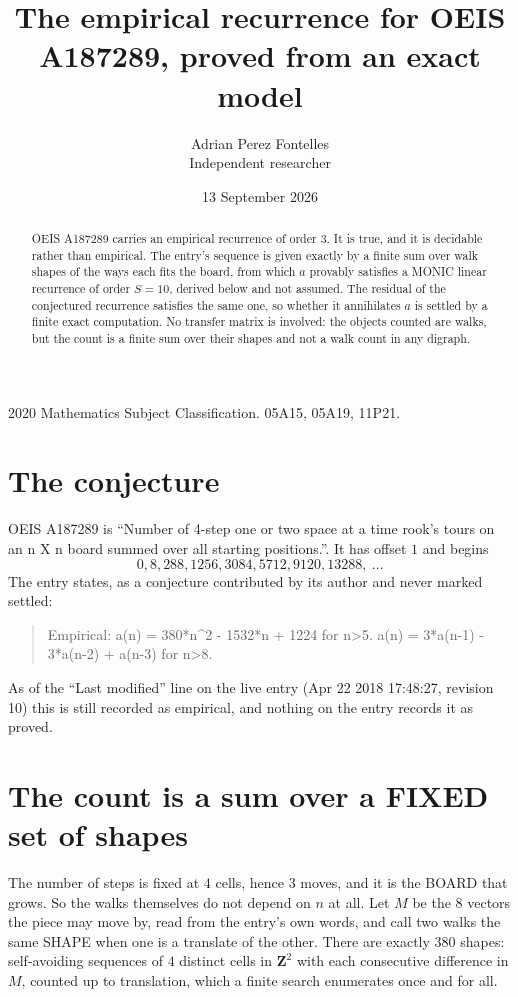 \documentclass[11pt,a4paper]{article}
\title{The empirical recurrence for OEIS A187289, proved from an exact model}
\author{Adrian Perez Fontelles\\ \small Independent researcher}
\date{13 September 2026}
\theoremstyle{plain}
\theoremstyle{definition}
\begin{document}
\maketitle

\begin{abstract}
OEIS A187289 carries an empirical recurrence of order $3$. It is true, and it is
decidable rather than empirical. The entry's sequence is given exactly by a finite sum over walk shapes of the ways each fits the board, from
which $a$ provably satisfies a MONIC linear recurrence of order $S=10$, derived below and not
assumed. The residual of the conjectured recurrence satisfies the same one, so whether it
annihilates $a$ is settled by a finite exact computation. No transfer matrix is involved: the objects counted are walks, but the count is a finite sum over their shapes and not a walk count in any digraph.
\end{abstract}

\noindent\small 2020 Mathematics Subject Classification. 05A15, 05A19, 11P21.\normalsize

\section{The conjecture}

OEIS A187289 is ``Number of 4-step one or two space at a time rook's tours on an n X n board summed over all starting positions.''. It has offset $1$ and begins
\[
0, 8, 288, 1256, 3084, 5712, 9120, 13288,\ \dots
\]
The entry states, as a conjecture contributed by its author and never marked settled:
\begin{quote}
Empirical: a(n) = 380*n\^{}2 - 1532*n + 1224 for n>5. a(n) = 3*a(n-1) - 3*a(n-2) + a(n-3) for n>8.
\end{quote}
As of the ``Last modified'' line on the live entry (Apr 22 2018 17:48:27, revision 10)
this is still recorded as empirical, and nothing on the entry records it as proved.

\section{The count is a sum over a FIXED set of shapes}

The number of steps is fixed at $4$ cells, hence $3$ moves, and it is the BOARD
that grows. So the walks themselves do not depend on $n$ at all. Let $M$ be the $8$
vectors the piece may move by, read from the entry's own words, and call two walks the same
SHAPE when one is a translate of the other. There are exactly $380$ shapes: self-avoiding
sequences of $4$ distinct cells in $\mathbf{Z}^{2}$ with each consecutive difference in
$M$, counted up to translation, which a finite search enumerates once and for all.
\end{document}
